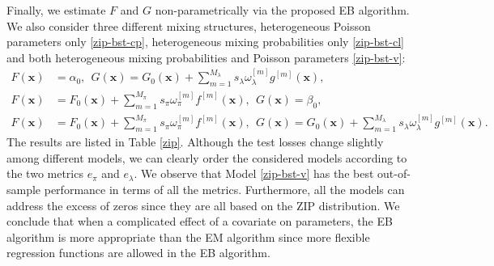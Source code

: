 \documentclass[11pt]{article}
\numberwithin{equation}{section}
\def\bx{\boldsymbol{x}}
\begin{document}
Finally, we estimate $F$ and $G$ non-parametrically via the proposed EB algorithm. We also consider three different mixing structures, heterogeneous Poisson parameters only  \eqref{zip-bst-cp}, heterogeneous mixing probabilities only \eqref{zip-bst-cl} and both heterogeneous mixing probabilities and Poisson parameters \eqref{zip-bst-v}: 
\begin{align}
	F(\bx)&=\alpha_0, ~~G(\bx)=G_0(\bx)+\sum_{m=1}^{M_\lambda} s_\lambda\omega_\lambda^{[m]} g^{[m]}(\bx), \label{zip-bst-cp} \\
	F(\bx)&=F_0(\bx)+\sum_{m=1}^{M_\pi} s_\pi\omega_\pi^{[m]} f^{[m]}(\bx), ~~G(\bx)=\beta_0, \label{zip-bst-cl} \\
	F(\bx)&=F_0(\bx)+\sum_{m=1}^{M_\pi} s_\pi\omega_\pi^{[m]} f^{[m]}(\bx),  ~~G(\bx)=G_0(\bx)+\sum_{m=1}^{M_\lambda} s_\lambda\omega_\lambda^{[m]} g^{[m]}(\bx). \label{zip-bst-v}
\end{align}  
The results are listed in Table \ref{zip}.
Although the test losses change slightly among different models, we can clearly order the considered models according to the two metrics $e_\pi$ and $e_\lambda$.
We observe that Model \eqref{zip-bst-v} has the best out-of-sample performance in terms of all the metrics.
Furthermore, all the models can address the excess of zeros since they are all based on the ZIP distribution.
We conclude that when a complicated effect of a covariate on parameters, the EB algorithm is more appropriate than the EM algorithm since more flexible regression functions are allowed in the EB algorithm.   
\end{document}
